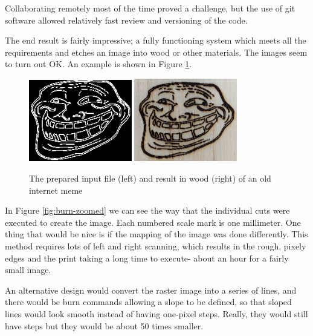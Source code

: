 \documentclass[11pt]{LaTeX-Classes/math-hw}
\begin{document}
Collaborating remotely most of the time proved a challenge, but the use of git software allowed
relatively fast review and versioning of the code.

The end result is fairly impressive; a fully functioning system which meets all the requirements
and etches an image into wood or other materials.
The images seem to turn out OK. An example is shown in Figure \ref{fig:troll-print}.
\begin{figure}[H]
  \begin{center}
    \includegraphics[width=0.4\textwidth]{trollface-edges}
    \includegraphics[width=0.4\textwidth]{trollface-result}
    \caption{The prepared input file (left) and result in wood (right) of an old internet meme}
    \label{fig:troll-print}
  \end{center}
\end{figure}

In Figure \ref{fig:burn-zoomed} we can see the way that the individual cuts were executed to
create the image.
Each numbered scale mark is one millimeter.
One thing that would be nice is if the mapping of the image was done differently.
This method requires lots of left and right scanning, which results in the rough, pixely edges
and the print taking a long time to execute- about an hour for a fairly small image.

An alternative design would convert the raster image into a series of lines,
and there would be burn commands allowing a slope to be defined, so that
sloped lines would look smooth instead of having one-pixel steps.
Really, they would still have steps but they would be about 50 times smaller.
\end{document}
